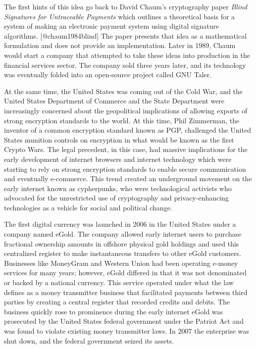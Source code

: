 The first hints of this idea go back to David Chaum's cryptography paper
\textit{Blind Signatures for Untraceable Payments} which outlines a theoretical
basis for a system of making an electronic payment system using digital
signature algorithms. [@chaum1984blind] The paper presents that idea as a
mathematical formulation and does not provide an implementation. Later in 1989,
Chaum would start a company that attempted to take these ideas into production
in the financial services sector. The company sold three years later, and its
technology was eventually folded into an open-source project called GNU Taler.

At the same time, the United States was coming out of the Cold War, and the
United States Department of Commerce and the State Department were increasingly
concerned about the geopolitical implications of allowing exports of strong
encryption standards to the world. At this time, Phil Zimmerman, the inventor of
a common encryption standard known as PGP, challenged the United States munition
controls on encryption in what would be known as the first Crypto Wars. The
legal precedent, in this case, had massive implications for the early
development of internet browsers and internet technology which were starting to
rely on strong encryption standards to enable secure communication and
eventually e-commerce. This trend created an underground movement on the early
internet known as cypherpunks, who were technological activists who advocated
for the unrestricted use of cryptography and privacy-enhancing technologies as a
vehicle for social and political change.


The first digital currency was launched in 2006 in the United States under a
company named eGold. The company allowed early internet users to purchase
fractional ownership amounts in offshore physical gold holdings and used this
centralized register to make instantaneous transfers to other eGold customers.
Businesses like MoneyGram and Western Union had been operating e-money services
for many years; however, eGold differed in that it was not denominated or backed
by a national currency. This service operated under what the law defines as a
money transmitter business that facilitated payments between third parties by
creating a central register that recorded credits and debits. The business
quickly rose to prominence during the early internet eGold was prosecuted by the
United States federal government under the Patriot Act and was found to violate
existing money transmitter laws. In 2007 the enterprise was shut down, and the
federal government seized its assets. \cite{popper_untold_2015}

